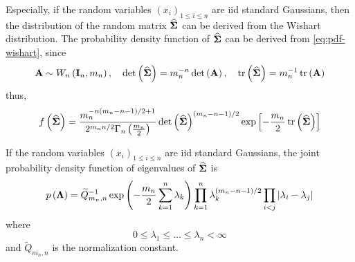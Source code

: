 \begin{remark}
	Especially, if the random variables $\left(x_{i}\right)_{1\leq i\leq n}$ are iid standard Gaussians, then the distribution of the random matrix $\widehat{\boldsymbol{\Sigma}}$ can be derived from the Wishart distribution. The probability density function of $\widehat{\boldsymbol{\Sigma}}$ can be derived from \eqref{eq:pdf-wishart}, since
	\begin{equation*}
		{\bf A}\sim W_{n}\left(\mathbf{I}_{n},m_{n}\right),\quad\operatorname{det}\left(\widehat{\boldsymbol{\Sigma}}\right)=m_{n}^{-n}\operatorname{det}\left({\bf A}\right),\quad\operatorname{tr}\left(\widehat{\boldsymbol{\Sigma}}\right)=m_{n}^{-1}\operatorname{tr}\left({\bf A}\right)
	\end{equation*}
	thus,
	\begin{equation}
		f\left(\widehat{\boldsymbol{\Sigma}}\right)=\frac{m_{n}^{-n(m_{n}-n-1)/2+1}}{2^{m_{n}n/2}\Gamma_{n}\left(\frac{m_{n}}{2}\right)}\operatorname{det}\left(\widehat{\boldsymbol{\Sigma}}\right)^{(m_{n}-n-1)/2}\exp\left[-\frac{m_{n}}{2}\operatorname{tr}\left(\widehat{\boldsymbol{\Sigma}}\right)\right]
	\end{equation}
\end{remark}

\begin{theorem}
	If the random variables $\left(x_{i}\right)_{1\leq i\leq n}$ are iid standard Gaussians, the joint probability density function of eigenvalues of $\widehat{\boldsymbol{\Sigma}}$ is
	\begin{equation}
		p\left(\boldsymbol{\Lambda}\right)=\widetilde{Q}_{m_{n},n}^{-1}\exp\left(-\frac{m_{n}}{2}\sum_{k=1}^{n}\lambda_{k}\right)\prod_{k=1}^{n}\lambda_{k}^{(m_{n}-n-1)/2}\prod_{i<j}\left|\lambda_{i}-\lambda_{j}\right|
		\label{eq:jpdf-eigenvalues-sigma}
	\end{equation}
	where
	\begin{equation*}
		0\leq\lambda_{1}\leq\ldots\leq\lambda_{n}<\infty
	\end{equation*}
	and $\widetilde{Q}_{m_{n},n}$ is the normalization constant.
\end{theorem}

